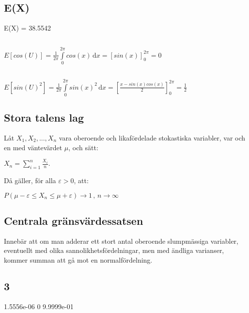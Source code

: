 \documentclass{article}
\begin{document}
\subsection{E(X)}
E(X) = 38.5542

\addtocounter{section}{1}

\subsection{}

$
E[cos(U)] =
\frac{1}{2\pi} \int \limits_0^{2\pi} cos(x) \, \mathrm{d}x =
\left[sin(x)\right]_0^{2\pi} =
0
$

\subsection{}

$
E[sin(U)^2] =
\frac{1}{2\pi} \int \limits_0^{2\pi} sin(x)^2 \, \mathrm{d}x =
\left[\frac{x-sin(x)cos(x)}{2}\right]_0^{2\pi} =
\frac{1}{2}
$

\addtocounter{section}{1}

\newpage

\subsection{Stora talens lag}

Låt $ X_1, X_2, ..., X_n $ vara oberoende och likafördelade stokastiska
variabler, var och en med väntevärdet $\mu$, och sätt:

$
X_n = \sum\limits_{i=1}^{n}\frac{X_i}{n}.
$

Då gäller, för alla $\varepsilon > 0$, att:

$
P(\mu - \varepsilon \le X_n \le \mu + \varepsilon) \to 1 \, , \, n \to \infty
$

\addtocounter{section}{1}

\subsection{Centrala gränsvärdessatsen}

Innebär att om man adderar ett stort antal oberoende slumpmässiga variabler,
eventuellt med olika sannolikhetsfördelningar, men med ändliga varianser, kommer
summan att gå mot en normalfördelning.

\subsection{3}
   1.5556e-06
            0
   9.9999e-01
\end{document}
